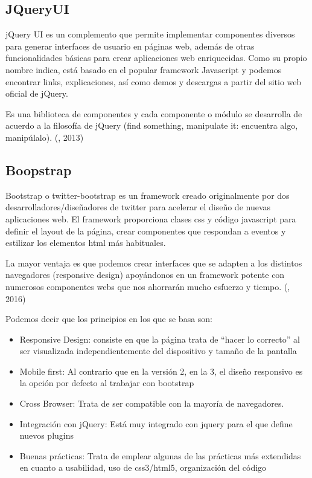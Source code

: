 \subsection{JQueryUI}
\setlength{\parskip}{5mm}
jQuery UI es un complemento que permite implementar componentes diversos para generar interfaces de usuario en páginas web, además de otras funcionalidades básicas para crear aplicaciones web enriquecidas. Como su propio nombre indica, está basado en el popular framework Javascript y podemos encontrar links, explicaciones, así como demos y descargas a partir del sitio web oficial de jQuery.

Es una biblioteca de componentes y cada componente o módulo se desarrolla de acuerdo a la filosofía de jQuery (find something, manipulate it: encuentra algo, manipúlalo).
\setlength{\parskip}{0mm}
(\citet{jqueryuibib}, 2013)

\subsection{Boopstrap}
\setlength{\parskip}{5mm}
Bootstrap o twitter-bootstrap es un framework creado originalmente por dos desarrolladores/diseñadores de twitter para acelerar el diseño de nuevas aplicaciones web.
El framework proporciona clases css y código javascript para definir el layout de la página, crear componentes que respondan a eventos y estilizar los elementos html más habituales.

La mayor ventaja es que podemos crear interfaces que se adapten a los distintos navegadores (responsive design) apoyándonos en un framework potente con numerosos componentes webs que nos ahorrarán mucho esfuerzo y tiempo. (\citet{bootstrap}, 2016)

Podemos decir que los principios en los que se basa son:
\setlength{\parskip}{0mm}
\begin{itemize}

	\item Responsive Design: consiste en que la página trata de “hacer lo correcto” al ser visualizada independientemente del dispositivo y tamaño de la pantalla
	
	\item Mobile first: Al contrario que en la versión 2, en la 3, el diseño responsivo es la opción por defecto al trabajar con bootstrap

	\item Cross Browser: Trata de ser compatible con la mayoría de navegadores.
	
	\item Integración con jQuery: Está muy integrado con jquery para el que define nuevos plugins

	\item Buenas prácticas: Trata de emplear algunas de las prácticas más extendidas en cuanto a usabilidad, uso de css3/html5, organización del código
	
	
\end{itemize}

